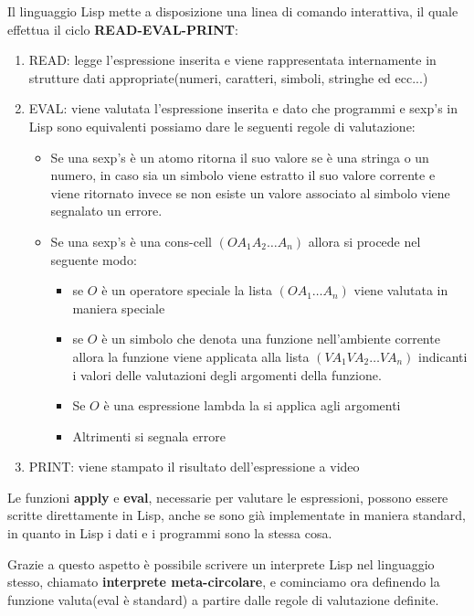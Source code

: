 \documentclass[a4paper]{book}
\begin{document}
Il linguaggio Lisp mette a disposizione una linea di comando interattiva, il quale
effettua il ciclo \textbf{READ-EVAL-PRINT}:
\begin{enumerate}
  \item READ: legge l'espressione inserita e viene rappresentata internamente in
        strutture dati appropriate(numeri, caratteri, simboli, stringhe ed ecc...)
  \item EVAL: viene valutata l'espressione inserita e dato che programmi e sexp's
        in Lisp sono equivalenti possiamo dare le seguenti regole di valutazione:
        \begin{itemize}
          \item Se una sexp's è un atomo ritorna il suo valore se è una stringa o un numero,
                in caso sia un simbolo viene estratto il suo valore corrente e viene ritornato
                invece se non esiste un valore associato al simbolo viene segnalato un errore.
          \item Se una sexp's è una cons-cell $(O A_1 A_2 \dots A_n)$ allora si procede nel seguente modo:
                \begin{itemize}
                  \item se $O$ è un operatore speciale la lista $(O A_1 \dots A_n)$
                        viene valutata in maniera speciale
                  \item se $O$ è un simbolo che denota una funzione nell'ambiente corrente
                        allora la funzione viene applicata alla lista $(VA_1 VA_2 \dots VA_n)$
                        indicanti i valori delle valutazioni degli argomenti della funzione.
                  \item Se $O$ è una espressione lambda la si applica agli argomenti
                  \item Altrimenti si segnala errore
                \end{itemize}
        \end{itemize}
  \item PRINT: viene stampato il risultato dell'espressione a video
\end{enumerate}
Le funzioni \textbf{apply} e \textbf{eval}, necessarie per valutare le espressioni,
possono essere scritte direttamente in Lisp, anche se sono già implementate in maniera standard,
in quanto in Lisp i dati e i programmi sono la stessa cosa.

Grazie a questo aspetto è possibile scrivere un interprete Lisp nel linguaggio stesso,
chiamato \textbf{interprete meta-circolare}, e cominciamo ora definendo la funzione valuta(eval è standard)
a partire dalle regole di valutazione definite.
\end{document}
